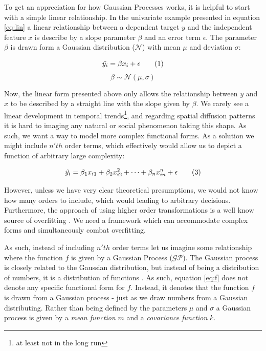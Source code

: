 \documentclass[a4paper]{article}
\begin{document}

To get an appreciation for how Gaussian Processes works, it is helpful to start with a simple linear relationship. In the univariate example presented in equation \ref{eq:lin} a linear relationship between a dependent target $y$ and the independent feature $x$ is describe by a slope parameter $\beta$ and an error term $\epsilon$. The parameter $\beta$ is drawn form a Gaussian distribution ($\mathcal{N}$) with mean $\mu$ and deviation $\sigma$:

\[
\Tilde{y_i} = \beta x_i + \epsilon  \tag{1} \label{eq:lin}
\]
\[
\beta \sim \mathcal{N}(\mu,\sigma)  \tag{2} \label{eq:beta}
\]

Now, the linear form presented above only allows the relationship between $y$ and $x$ to be described by a straight line with the slope given by $\beta$. We rarely see a linear development in temporal trends\footnote{at least not in the long run}, and regarding spatial diffusion patterns it is hard to imaging any natural or social phenomenon taking this shape. As such, we want a way to model more complex functional forms. As a solution we might include $n'th$ order terms, which effectively would allow us to depict a function of arbitrary large complexity:\par

\[
\Tilde{y_i} = \beta_1 x_{i1} + \beta_2 x_{i2}^2 + \dots + \beta_n x_{in}^n + \epsilon  \tag{3} \label{eq:orders}
\]

However, unless we have very clear theoretical presumptions, we would not know how many orders to include, which would leading to arbitrary decisions. Furthermore, the approach of using higher order transformations is a well know source of overfitting \citep[2]{williams2006gaussian}. We need a framework which can accommodate complex forms and simultaneously combat overfitting.\par

As such, instead of including $n'th$ order terms let us imagine some relationship where the function $f$ is given by a Gaussian Process ($\mathcal{GP}$). The Gaussian process is closely related to the Gaussian distribution, but instead of being a distribution of numbers, it is a distribution of functions \citep[13-15]{williams2006gaussian}. As such, equation \ref{eq:f} does not denote any specific functional form for $f$. Instead, it denotes that the function $f$ is drawn from a Gaussian process - just as we draw numbers from a Gaussian distributing. Rather than being defined by the parameters $\mu$ and $\sigma$ a Gaussian process is given by a \emph{mean function} $m$ and a \emph{covariance function} $k$.\par
\end{document}
